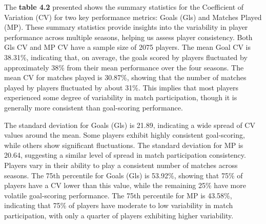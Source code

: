 \documentclass[12pt, a4paper,oneside]{book}
\numberwithin{equation}{section}
\begin{document}
\begin{table}[ht]
    \centering
    \caption{Goals CV and Matches Played CV Statistics}
\end{table}

The \textbf{table 4.2} presented shows the summary statistics for the Coefficient of Variation (CV) for two key performance metrics: Goals (Gls) and Matches Played (MP). These summary statistics provide insights into the variability in player performance across multiple seasons, helping us assess player consistency. Both Gls CV and MP CV have a sample size of 2075 players. The mean Goal CV is 38.31\%, indicating that, on average, the goals scored by players fluctuated by approximately 38\% from their mean performance over the four seasons. The mean CV for matches played is 30.87\%, showing that the number of matches played by players fluctuated by about 31\%. This implies that most players experienced some degree of variability in match participation, though it is generally more consistent than goal-scoring performance. 

The standard deviation for Goals (Gls) is 21.89, indicating a wide spread of CV values around the mean. Some players exhibit highly consistent goal-scoring, while others show significant fluctuations. The standard deviation for MP is 20.64, suggesting a similar level of spread in match participation consistency. Players vary in their ability to play a consistent number of matches across seasons. The 75th percentile for Goals (Gls) is 53.92\%, showing that 75\% of players have a CV lower than this value, while the remaining 25\% have more volatile goal-scoring performance. The 75th percentile for MP is 43.58\%, indicating that 75\% of players have moderate to low variability in match participation, with only a quarter of players exhibiting higher variability.
\end{document}
